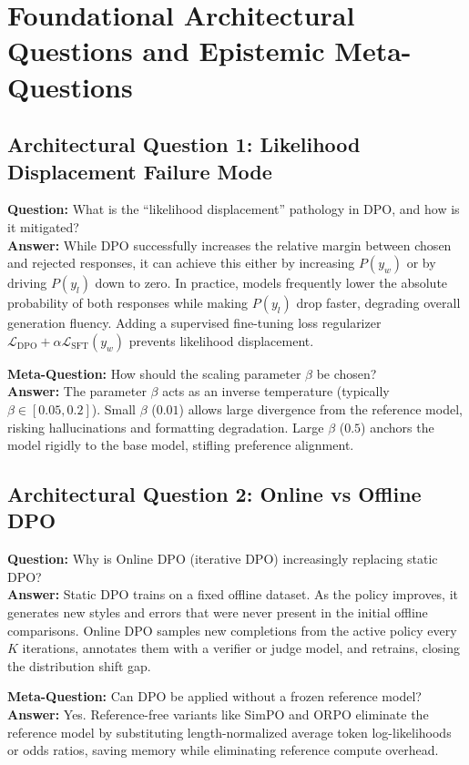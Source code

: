 \documentclass[11pt,a4paper]{article}
\theoremstyle{definition}
\begin{document}
\section{Foundational Architectural Questions and Epistemic Meta-Questions}

\subsection{Architectural Question 1: Likelihood Displacement Failure Mode}
\textbf{Question:} What is the ``likelihood displacement'' pathology in DPO, and how is it mitigated?\\
\textbf{Answer:} While DPO successfully increases the relative margin between chosen and rejected responses, it can achieve this either by increasing $P(y_w)$ or by driving $P(y_l)$ down to zero. In practice, models frequently lower the absolute probability of both responses while making $P(y_l)$ drop faster, degrading overall generation fluency. Adding a supervised fine-tuning loss regularizer $\mathcal{L}_{\text{DPO}} + \alpha \mathcal{L}_{\text{SFT}}(y_w)$ prevents likelihood displacement.

\textbf{Meta-Question:} How should the scaling parameter $\beta$ be chosen?\\
\textbf{Answer:} The parameter $\beta$ acts as an inverse temperature (typically $\beta \in [0.05, 0.2]$). Small $\beta$ ($0.01$) allows large divergence from the reference model, risking hallucinations and formatting degradation. Large $\beta$ ($0.5$) anchors the model rigidly to the base model, stifling preference alignment.

\subsection{Architectural Question 2: Online vs Offline DPO}
\textbf{Question:} Why is Online DPO (iterative DPO) increasingly replacing static DPO?\\
\textbf{Answer:} Static DPO trains on a fixed offline dataset. As the policy improves, it generates new styles and errors that were never present in the initial offline comparisons. Online DPO samples new completions from the active policy every $K$ iterations, annotates them with a verifier or judge model, and retrains, closing the distribution shift gap.

\textbf{Meta-Question:} Can DPO be applied without a frozen reference model?\\
\textbf{Answer:} Yes. Reference-free variants like SimPO and ORPO eliminate the reference model by substituting length-normalized average token log-likelihoods or odds ratios, saving memory while eliminating reference compute overhead.
\end{document}
